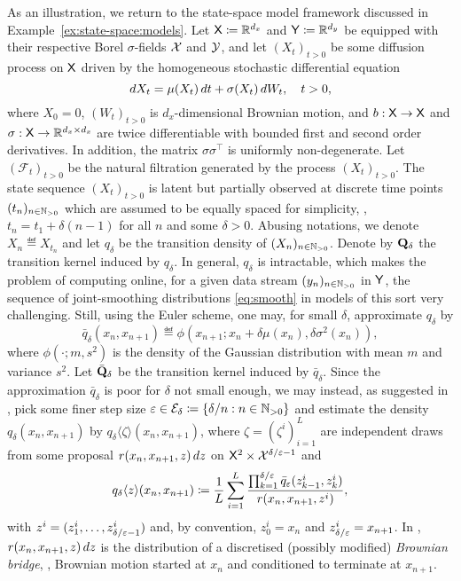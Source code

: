 \begin{example}
\label{eq:durham:gallant}
As an illustration, we return to the state-space model framework discussed in Example~\ref{ex:state-space:models}. Let $\mathsf{X} \coloneqq \mathbb{R}^{d_x}$ and $\mathsf{Y} \coloneqq \mathbb{R}^{d_y}$ be equipped with their respective Borel $\sigma$-fields $\mathcal{X}$ and $\mathcal{Y}$, and let $(X_t)_{t > 0}$ be some diffusion process on $\mathsf{X}$ driven by the homogeneous stochastic differential equation
\begin{equation} \label{eq:SDE}
\rmd X_t = \mu(X_t) \, \rmd t + \sigma(X_t) \, \rmd W_t, \quad t > 0, 
\end{equation}
where $X_0 = 0$, $(W_t)_{t > 0}$ is $d_x$-dimensional Brownian motion, and $b : \mathsf{X} \to \mathsf{X}$ and $\sigma : \mathsf{X} \to \mathbb{R}^{d_x \times d_x}$ are twice differentiable with bounded first and second order derivatives. In addition, the matrix $\sigma \sigma^\intercal$ is uniformly non-degenerate. Let $(\mathcal{F}_t)_{t > 0}$ be the natural filtration generated by the process $(X_t)_{t > 0}$. The state sequence $(X_t)_{t > 0}$ is latent but partially observed at discrete time points $(t_n)_{n \in \mathbb{N}_{> 0}}$ which are assumed to be equally spaced for simplicity, \ie, $t_n = t_1 + \delta (n - 1)$ for all $n$ and some $\delta > 0$. Abusing notations, we denote $X_n \eqdef X_{t_n}$ and let $q_\delta$ be the transition density of $(X_n)_{n \in \mathbb{N}_{> 0}}$. Denote by $\mathbf{Q}_\delta$ the transition kernel induced by $q_\delta$. In general, $q_\delta$ is intractable, which makes the problem of computing online, for a given data stream $(y_n)_{n \in \mathbb{N}_{> 0}}$ in $\mathsf{Y}$, the sequence of joint-smoothing distributions \eqref{eq:smooth} in models of this sort very challenging. Still, using the Euler scheme, one may, for small $\delta$, approximate $q_\delta$ by 
$$
\bar{q}_\delta(x_n, x_{n + 1}) \eqdef \phi(x_{n + 1}; x_n + \delta \mu(x_n), \delta \sigma^2(x_n)), 
$$ 
where $\phi(\cdot; m, s^2)$ is the density of the Gaussian distribution with mean $m$ and variance $s^2$. Let $\bar{\mathbf{Q}}_\delta$ be the transition kernel induced by $\bar{q}_\delta$. Since the approximation $\bar{q}_\delta$ is poor for $\delta$ not small enough, we may instead, as suggested in \cite{durham:gallant:2002}, pick some finer step size $\varepsilon \in \mathcal{E}_\delta \coloneqq \{ \delta / n : n \in \mathbb{N}_{> 0} \}$ and estimate the density $q_\delta(x_n, x_{n + 1})$ by $q_\delta \langle \zeta \rangle (x_n, x_{n + 1})$, where $\zeta = (\zeta^i)_{i = 1}^L$ are independent draws from some proposal $r(x_n, x_{n + 1}, z) \, d z$ on $\mathsf{X}^2 \times \mathcal{X}^{\delta / \varepsilon - 1}$ and  
$$
q_\delta \langle z \rangle (x_n, x_{n + 1}) \coloneqq \frac{1}{L} \sum_{i = 1}^L \frac{\prod_{k = 1}^{\delta / \varepsilon} \bar{q}_\varepsilon(z_{k - 1}^i, z_k^i)}{r(x_n, x_{n + 1}, z^i)},  
$$
with $z^i = (z_1^i, \ldots, z_{\delta / \varepsilon - 1}^i)$ and, by convention, $z_0^i = x_n$ and $z_{\delta / \varepsilon}^i = x_{n + 1}$. In \cite{durham:gallant:2002}, $r(x_n, x_{n + 1}, z) \, d z$ is the distribution of a discretised (possibly modified) \emph{Brownian bridge}, \ie, Brownian motion started at $x_n$ and conditioned to terminate at $x_{n + 1}$. 


\end{example}
